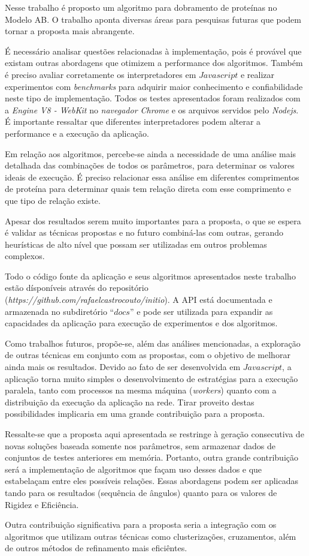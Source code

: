 \documentclass[dm,ppgcomp]{texfurg}
\begin{document}
Nesse trabalho é proposto um algoritmo para dobramento de proteínas no Modelo AB. O trabalho aponta diversas áreas para pesquisas futuras que podem tornar a proposta mais abrangente. 

É necessário analisar questões relacionadas à implementação, pois é provável que existam outras abordagens que otimizem a performance dos algoritmos. Também é preciso avaliar corretamente os interpretadores em $Javascript$ e realizar experimentos com {\it benchmarks} para adquirir maior conhecimento e confiabilidade neste tipo de implementação. Todos os testes apresentados foram realizados com a {\it Engine V8 - WebKit} no {\it navegador Chrome} e os arquivos servidos pelo {\it Nodejs}. É importante ressaltar que diferentes interpretadores podem alterar a performance e a execução da aplicação.

Em relação aos algoritmos, percebe-se ainda a necessidade de uma análise mais detalhada das combinações de todos os parâmetros, para determinar os valores ideais de execução. É preciso relacionar essa análise em diferentes comprimentos de proteína para determinar quais tem relação direta com esse comprimento e que tipo de relação existe.

Apesar dos resultados serem muito importantes para a proposta, o que se espera é validar as técnicas propostas e no futuro combiná-las com outras, gerando heurísticas de alto nível que possam ser utilizadas em outros problemas complexos. 

Todo o código fonte da aplicação e seus algoritmos apresentados neste trabalho estão dísponíveis através do repositório ({\it https://github.com/rafaelcastrocouto/initio}). A API está documentada e armazenada no subdiretório “$docs$” e pode ser utilizada para expandir as capacidades da aplicação para execução de experimentos e dos algoritmos.

Como trabalhos futuros, propõe-se, além das análises mencionadas, a exploração de outras técnicas em conjunto com as propostas, com o objetivo de melhorar ainda mais os resultados. Devido ao fato de ser desenvolvida em $Javascript$, a aplicação torna muito simples o desenvolvimento de estratégias para a execução paralela, tanto com processos na mesma máquina ({\it workers}) quanto com a distribuição da execução da aplicação na rede. Tirar proveito destas possibilidades implicaria em uma grande contribuição para a proposta.

Ressalte-se que a proposta aqui apresentada se restringe à geração consecutiva de novas soluções baseada somente nos parâmetros, sem armazenar dados de conjuntos de testes anteriores em memória. Portanto, outra grande contribuição será a implementação de algoritmos que façam uso desses dados e que estabelaçam entre eles possíveis relações. Essas abordagens podem ser aplicadas tando para os resultados (sequência de ângulos) quanto para os valores de Rigidez e Eficiência.

Outra contribuição significativa para a proposta seria a integração com os algoritmos que utilizam outras técnicas como clusterizações, cruzamentos, além de outros métodos de refinamento mais eficiêntes.


\nocite{*}

\end{document}

